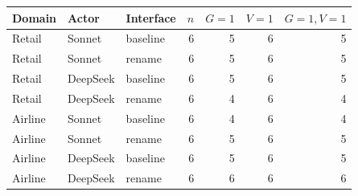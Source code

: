 \begin{tabular}{lllrrrr}
\toprule
Domain & Actor & Interface & $n$ & $G=1$ & $V=1$ & $G=1,V=1$\\
\midrule
Retail & Sonnet & baseline & 6 & 5 & 6 & 5\\
Retail & Sonnet & rename & 6 & 5 & 6 & 5\\
Retail & DeepSeek & baseline & 6 & 5 & 6 & 5\\
Retail & DeepSeek & rename & 6 & 4 & 6 & 4\\
Airline & Sonnet & baseline & 6 & 4 & 6 & 4\\
Airline & Sonnet & rename & 6 & 5 & 6 & 5\\
Airline & DeepSeek & baseline & 6 & 5 & 6 & 5\\
Airline & DeepSeek & rename & 6 & 6 & 6 & 6\\
\bottomrule
\end{tabular}

